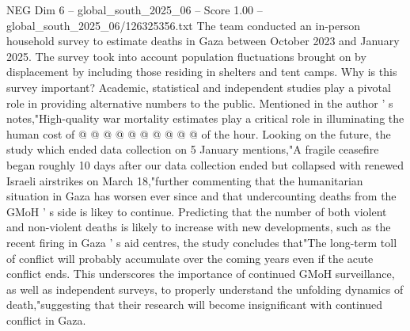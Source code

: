 \begin{textsample}{NEG Dim 6 – global\_south\_2025\_06 – Score 1.00 – global\_south\_2025\_06/126325356.txt}
The team conducted an in-person household survey to estimate deaths in Gaza between October 2023 and January 2025.
The survey took into account population fluctuations brought on by displacement by including those residing in shelters and tent camps.
Why is this survey important?
Academic, statistical and independent studies play a pivotal role in providing alternative numbers to the public.
Mentioned in the author ' s notes,"High-quality war mortality estimates play a critical role in illuminating the human cost of @ @ @ @ @ @ @ @ @ @ of the hour.
Looking on the future, the study which ended data collection on 5 January mentions,"A fragile ceasefire began roughly 10 days after our data collection ended but collapsed with renewed Israeli airstrikes on March 18,"further commenting that the humanitarian situation in Gaza has worsen ever since and that undercounting deaths from the GMoH ' s side is likey to continue.
Predicting that the number of both violent and non-violent deaths is likely to increase with new developments, such as the recent firing in Gaza ' s aid centres, the study concludes that"The long-term toll of conflict will probably accumulate over the coming years even if the acute conflict ends.
This underscores the importance of continued GMoH surveillance, as well as independent surveys, to properly understand the unfolding dynamics of death,"suggesting that their research will become insignificant with continued conflict in Gaza.

\end{textsample}
